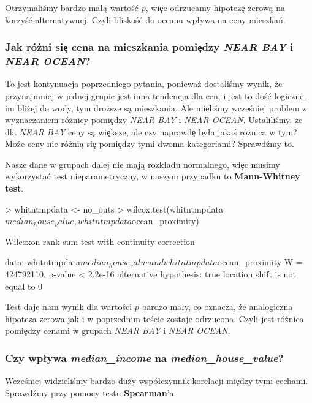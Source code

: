 \documentclass{article}
\begin{document}
\noindent
\quad Otrzymaliśmy bardzo ma\l ą wartoś\'c $p$, wi\c ec odrzucamy hipotez\c e zerową na korzyś\'c alternatywnej. Czyli bliskoś\'c do oceanu wp\l ywa na ceny mieszkań.

\subsubsection{Jak różni si\c e cena na mieszkania pomi\c edzy \textit{NEAR BAY} i \textit{NEAR OCEAN}?}
\quad To jest kontynuacja poprzedniego pytania, ponieważ dostaliśmy wynik, że przynajmniej w jednej grupie jest inna tendencja dla cen, i jest to doś\'c logiczne, im bliżej do wody, tym droższe są mieszkania. Ale mieliśmy wcześniej problem z wyznaczaniem różnicy pomi\c edzy \textit{NEAR BAY} i \textit{NEAR OCEAN}. Ustaliliśmy, że dla \textit{NEAR BAY} ceny są wi\c eksze, ale czy naprawd\c e by\l a jakaś różnica w tym? Może ceny nie różnią si\c e pomi\c edzy tymi dwoma kategoriami? Sprawdźmy to.

\noindent
\quad Nasze dane w grupach dalej nie mają rozk\l adu normalnego, wi\c ec musimy wykorzysta\'c test nieparametryczny, w naszym przypadku to \textbf{Mann-Whitney test}.

\begin{Schunk}
\begin{Sinput}
> whitntmpdata <- no_outs %>% filter(ocean_proximity == 3 || ocean_proximity == 4)
> wilcox.test(whitntmpdata$median_house_value, whitntmpdata$ocean_proximity)
\end{Sinput}
\begin{Soutput}
	Wilcoxon rank sum test with continuity correction

data:  whitntmpdata$median_house_value and whitntmpdata$ocean_proximity
W = 424792110, p-value < 2.2e-16
alternative hypothesis: true location shift is not equal to 0
\end{Soutput}
\end{Schunk}

\noindent
\quad Test daje nam wynik dla wartości $p$ bardzo ma\l y, co oznacza, że analogiczna hipoteza zerowa jak i w poprzednim teście zostaje odrzucona. Czyli jest różnica pomi\c edzy cenami w grupach \textit{NEAR BAY} i \textit{NEAR OCEAN}.

\subsubsection{Czy wp\l ywa \textit{median\_income} na \textit{median\_house\_value}?}
\quad Wcześniej widzieliśmy bardzo duży wspó\l czynnik korelacji mi\c edzy tymi cechami. Sprawdźmy przy pomocy testu \textbf{Spearman}'a.
\end{document}
